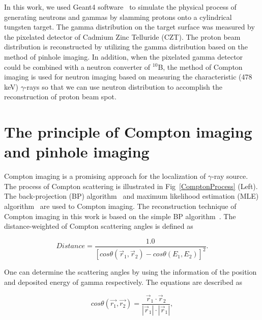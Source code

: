 \documentclass[a4paper,11pt]{article}
\begin{document}
In this work, we used Geant4 software~\cite{Geant4} to simulate the physical process of generating neutrons and gammas by slamming protons onto a cylindrical tungsten target. The gamma distribution on the target surface was measured by the pixelated detector of Cadmium Zinc Telluride (CZT). The proton beam distribution is reconstructed by utilizing the gamma distribution based on the method of pinhole imaging. In addition, when the pixelated gamma detector could be combined with a neutron converter of $^{10}$B, the method of Compton imaging is used for neutron imaging based on measuring the characteristic (478 keV) $\gamma$-rays so that we can use neutron distribution to accomplish the reconstruction of proton beam spot. 





\section{The principle of Compton imaging and pinhole imaging}


Compton imaging is a promising approach for the localization of $\gamma$-ray source. The process of Compton scattering is illustrated in Fig~\ref{ComptonProcess} (Left). The back-projection (BP) algorithm~\cite{BackProjection}  and maximum likelihood estimation (MLE) algorithm~\cite{MLM, LMLM} are used to Compton imaging. The reconstruction technique of Compton imaging in this work is based on the simple BP algorithm~\cite{ComptonImage1, 3DCZT}. The distance-weighted of Compton scattering angles is defined as 


\begin{center}
\begin{equation}
Distance =  \frac{1.0}{[cos\theta(\vec {r}_{1}, \vec {r}_{2})  - cos\theta(E_{1}, E_{2}) ]^{2}}.
\label{DistanceWeighted}
\end{equation}
\end{center}



One can determine the scattering angles by using the information of the position and deposited energy of gamma respectively. The equations are described as

\begin{center}
\begin{equation}
cos\theta(\vec {r_{1}}, \vec {r_{2}}) =  \frac{\vec {r}_{1} \cdot \vec {r}_{2} }{|\vec {r}_{1} | \cdot |\vec {r}_{1} |},
\label{ComptonFuncPosition}
\end{equation}
\end{center}
\end{document}
